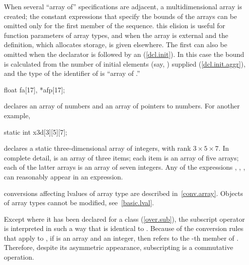 \pnum
When several ``array of'' specifications are adjacent, a multidimensional
array is created;
the constant expressions that specify the bounds
of the arrays can be omitted only for the first member of the sequence.
\enternote
this elision is useful for function parameters of array types, and when the
array is external and the definition, which allocates storage, is given
elsewhere.
\exitnote
The first  can
also be omitted
when the declarator is followed by an
(\ref{dcl.init}).
In this case the bound is calculated from the number
%
of initial elements (say,
)
supplied
(\ref{dcl.init.aggr}), and the type of the identifier of
is ``array of
.''

\pnum
\enterexample
{}%
%
\begin{codeblock}
float fa[17], *afp[17];
\end{codeblock}

declares an array of
numbers and an array of
pointers to
numbers.
%
For another example,

\begin{codeblock}
static int x3d[3][5][7];
\end{codeblock}

declares a static three-dimensional array of integers,
with rank $3 \times 5 \times 7$.
In complete detail,
is an array of three items;
each item is an array of five arrays;
each of the latter arrays is an array of seven
integers.
Any of the expressions
,
,
,
can reasonably appear in an expression.
\exitexample

\pnum
\enternote
conversions affecting lvalues of array type are described in~\ref{conv.array}.
Objects of array types cannot be modified, see~\ref{basic.lval}.
\exitnote

\pnum
Except where it has been declared for a class (\ref{over.sub}),
the subscript operator
\tcode{[]}
is interpreted
in such a way that
is identical to
.
Because of the conversion rules
that apply to
\tcode{+},
if
is an array and
an integer,
then
refers to the
-th
member of
.
Therefore,
despite its asymmetric
appearance, subscripting is a commutative operation.

